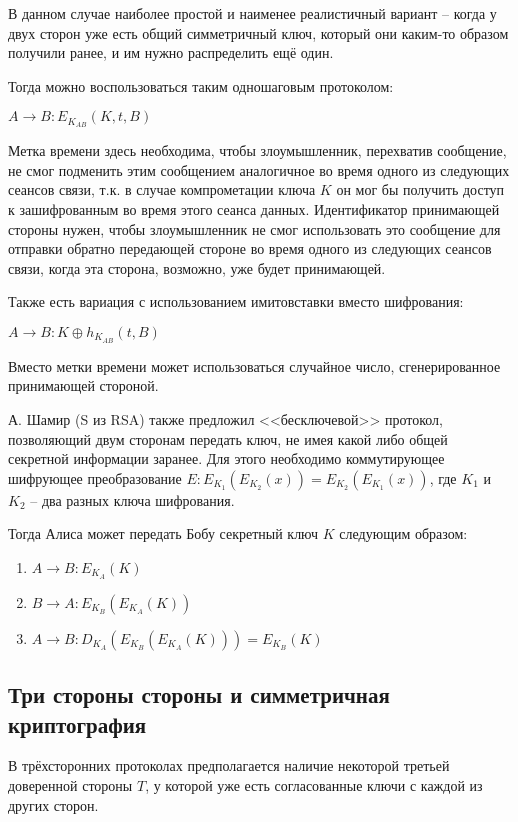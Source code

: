 В данном случае наиболее простой и наименее реалистичный вариант -- когда у двух сторон уже есть общий симметричный ключ, который они каким-то образом получили ранее, и им нужно распределить ещё один. 

Тогда можно воспользоваться таким одношаговым протоколом:

$A \rightarrow B: E_{K_{AB}}(K, t, B)$

Метка времени здесь необходима, чтобы злоумышленник, перехватив сообщение, не смог подменить этим сообщением аналогичное во время одного из следующих сеансов связи, т.к. в случае компрометации ключа $K$ он мог бы получить доступ к зашифрованным во время этого сеанса данных. Идентификатор принимающей стороны нужен, чтобы злоумышленник не смог использовать это сообщение для отправки обратно передающей стороне во время одного из следующих сеансов связи, когда эта сторона, возможно, уже будет принимающей.

Также есть вариация с использованием имитовставки вместо шифрования:

$A \rightarrow B: K \oplus h_{K_{AB}}(t, B)$

Вместо метки времени может использоваться случайное число, сгенерированное принимающей стороной.

А. Шамир (S из RSA) также предложил <<бесключевой>> протокол, позволяющий двум сторонам передать ключ, не имея какой либо общей секретной информации заранее. Для этого необходимо коммутирующее шифрующее преобразование $E: E_{K_1}(E_{K_2}(x)) = E_{K_2}(E_{K_1}(x))$, где $K_1$ и $K_2$ -- два разных ключа шифрования. 

Тогда Алиса может передать Бобу секретный ключ $K$ следующим образом:

\begin{enumerate}
	\item $A \rightarrow B: E_{K_A}(K)$
	\item $B \rightarrow A: E_{K_B}(E_{K_A}(K))$
	\item $A \rightarrow B: D_{K_A}(E_{K_B}(E_{K_A}(K))) = E_{K_B}(K)$
\end{enumerate}

\subsection{Три стороны стороны и симметричная криптография}

В трёхсторонних протоколах предполагается наличие некоторой третьей доверенной стороны $T$, у которой уже есть согласованные ключи с каждой из других сторон.

